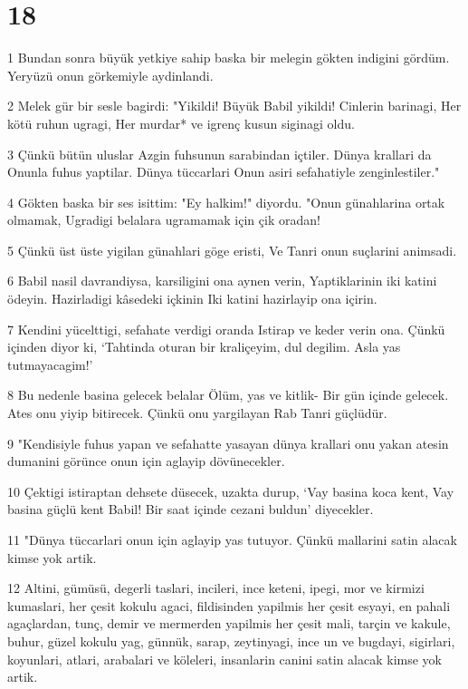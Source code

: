 \chapter{18}

\par 1 Bundan sonra büyük yetkiye sahip baska bir melegin gökten indigini gördüm. Yeryüzü onun görkemiyle aydinlandi.
\par 2 Melek gür bir sesle bagirdi: "Yikildi! Büyük Babil yikildi! Cinlerin barinagi, Her kötü ruhun ugragi, Her murdar* ve igrenç kusun siginagi oldu.
\par 3 Çünkü bütün uluslar Azgin fuhsunun sarabindan içtiler. Dünya krallari da Onunla fuhus yaptilar. Dünya tüccarlari Onun asiri sefahatiyle zenginlestiler."
\par 4 Gökten baska bir ses isittim: "Ey halkim!" diyordu. "Onun günahlarina ortak olmamak, Ugradigi belalara ugramamak için çik oradan!
\par 5 Çünkü üst üste yigilan günahlari göge eristi, Ve Tanri onun suçlarini animsadi.
\par 6 Babil nasil davrandiysa, karsiligini ona aynen verin, Yaptiklarinin iki katini ödeyin. Hazirladigi kâsedeki içkinin Iki katini hazirlayip ona içirin.
\par 7 Kendini yücelttigi, sefahate verdigi oranda Istirap ve keder verin ona. Çünkü içinden diyor ki, `Tahtinda oturan bir kraliçeyim, dul degilim. Asla yas tutmayacagim!'
\par 8 Bu nedenle basina gelecek belalar Ölüm, yas ve kitlik- Bir gün içinde gelecek. Ates onu yiyip bitirecek. Çünkü onu yargilayan Rab Tanri güçlüdür.
\par 9 "Kendisiyle fuhus yapan ve sefahatte yasayan dünya krallari onu yakan atesin dumanini görünce onun için aglayip dövünecekler.
\par 10 Çektigi istiraptan dehsete düsecek, uzakta durup, `Vay basina koca kent, Vay basina güçlü kent Babil! Bir saat içinde cezani buldun' diyecekler.
\par 11 "Dünya tüccarlari onun için aglayip yas tutuyor. Çünkü mallarini satin alacak kimse yok artik.
\par 12 Altini, gümüsü, degerli taslari, incileri, ince keteni, ipegi, mor ve kirmizi kumaslari, her çesit kokulu agaci, fildisinden yapilmis her çesit esyayi, en pahali agaçlardan, tunç, demir ve mermerden yapilmis her çesit mali, tarçin ve kakule, buhur, güzel kokulu yag, günnük, sarap, zeytinyagi, ince un ve bugdayi, sigirlari, koyunlari, atlari, arabalari ve köleleri, insanlarin canini satin alacak kimse yok artik.

